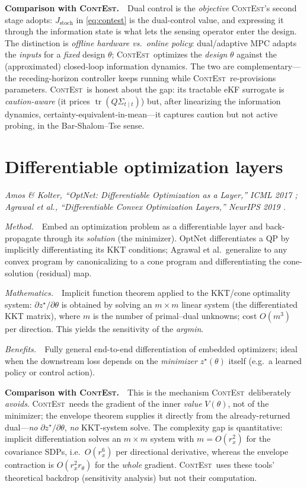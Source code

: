\documentclass[11pt]{article}
\DeclareMathOperator{\tr}{tr}
\newcommand{\Th}{\theta}
\newcommand{\ContEst}{\textsc{ContEst}}
\newcommand{\Method}{\smallskip\noindent\textit{Method.}~}
\newcommand{\Maths}{\smallskip\noindent\textit{Mathematics.}~}
\newcommand{\Benefits}{\smallskip\noindent\textit{Benefits.}~}
\newcommand{\Versus}{\smallskip\noindent\textbf{Comparison with \ContEst.}~}
\begin{document}
\Versus\ Dual control is the \emph{objective} \ContEst's second stage adopts:
$J_{\mathrm{stoch}}$ in \eqref{eq:contest} is the dual-control value, and expressing
it through the information state is what lets the sensing operator enter the design.
The distinction is \emph{offline hardware vs.\ online policy}: dual/adaptive MPC
adapts the \emph{inputs} for a \emph{fixed} design $\Th$; \ContEst\ optimizes the
\emph{design} $\Th$ against the (approximated) closed-loop information dynamics. The
two are complementary---the receding-horizon controller keeps running while
\ContEst\ re-provisions parameters. \ContEst\ is honest about the gap: its tractable
eKF surrogate is \emph{caution-aware} (it prices $\tr(Q\Sigma_{t\mid t})$) but,
after linearizing the information dynamics, certainty-equivalent-in-mean---it
captures caution but not active probing, in the Bar-Shalom--Tse sense.

\section{Differentiable optimization layers}\label{sec:diffopt}
\noindent\emph{Amos \& Kolter, ``OptNet: Differentiable Optimization as a Layer,''
ICML 2017 \cite{amos2017optnet}; Agrawal et al., ``Differentiable Convex
Optimization Layers,'' NeurIPS 2019 \cite{agrawal2019differentiable}.}

\Method\ Embed an optimization problem as a differentiable layer and back-propagate
through its \emph{solution} (the minimizer). OptNet differentiates a QP by
implicitly differentiating its KKT conditions; Agrawal et al.\ generalize to any
convex program by canonicalizing to a cone program and differentiating the
cone-solution (residual) map.

\Maths\ Implicit function theorem applied to the KKT/cone optimality system:
$\partial z^\star/\partial\Th$ is obtained by solving an $m\times m$ linear system
(the differentiated KKT matrix), where $m$ is the number of primal--dual unknowns;
cost $O(m^3)$ per direction. This yields the sensitivity of the \emph{argmin}.

\Benefits\ Fully general end-to-end differentiation of embedded optimizers; ideal
when the downstream loss depends on the \emph{minimizer} $z^\star(\Th)$ itself
(e.g.\ a learned policy or control action).

\Versus\ This is the mechanism \ContEst\ deliberately \emph{avoids}. \ContEst\ needs
the gradient of the inner \emph{value} $V(\Th)$, not of the minimizer; the envelope
theorem supplies it directly from the already-returned dual---\emph{no}
$\partial z^\star/\partial\Th$, \emph{no} KKT-system solve. The complexity gap is
quantitative: implicit differentiation solves an $m\times m$ system with
$m=O(r_x^2)$ for the covariance SDPs, i.e.\ $O(r_x^6)$ per directional derivative,
whereas the envelope contraction is $O(r_x^2 r_\theta)$ for the \emph{whole}
gradient. \ContEst\ uses these tools' theoretical backdrop (sensitivity analysis)
but not their computation.
\end{document}
